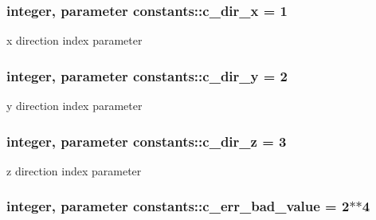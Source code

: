 \subsubsection[{\texorpdfstring{c\+\_\+dir\+\_\+x}{c_dir_x}}]{\setlength{\rightskip}{0pt plus 5cm}integer, parameter constants\+::c\+\_\+dir\+\_\+x = 1}\hypertarget{namespaceconstants_a8e38e74e9723ce351e7a20787e649e89}{}\label{namespaceconstants_a8e38e74e9723ce351e7a20787e649e89}


x direction index parameter 

\subsubsection[{\texorpdfstring{c\+\_\+dir\+\_\+y}{c_dir_y}}]{\setlength{\rightskip}{0pt plus 5cm}integer, parameter constants\+::c\+\_\+dir\+\_\+y = 2}\hypertarget{namespaceconstants_a5d84bc6ed2e3bd7b6e64704dc587825b}{}\label{namespaceconstants_a5d84bc6ed2e3bd7b6e64704dc587825b}


y direction index parameter 

\subsubsection[{\texorpdfstring{c\+\_\+dir\+\_\+z}{c_dir_z}}]{\setlength{\rightskip}{0pt plus 5cm}integer, parameter constants\+::c\+\_\+dir\+\_\+z = 3}\hypertarget{namespaceconstants_a9d2fa70332164d956c148a895e769983}{}\label{namespaceconstants_a9d2fa70332164d956c148a895e769983}


z direction index parameter 

\subsubsection[{\texorpdfstring{c\+\_\+err\+\_\+bad\+\_\+value}{c_err_bad_value}}]{\setlength{\rightskip}{0pt plus 5cm}integer, parameter constants\+::c\+\_\+err\+\_\+bad\+\_\+value = 2$\ast$$\ast$4}\hypertarget{namespaceconstants_a0c96dab545557ad23bf55d7576f5405f}{}\label{namespaceconstants_a0c96dab545557ad23bf55d7576f5405f}
